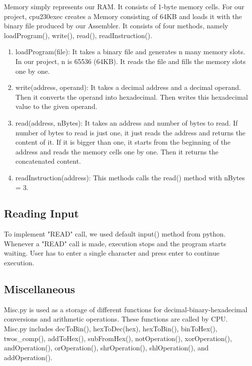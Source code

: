\documentclass[12pt,a4paper]{article}
\begin{document}
Memory simply represents our RAM. It consists of 1-byte memory cells. For our project, cpu230exec creates a Memory consisting of 64KB and loads it with the binary file produced by our Assembler. It consists of four methods, namely loadProgram(), write(), read(), readInstruction().

\begin{enumerate}
    \item loadProgram(file): It takes a binary file and generates n many memory slots. In our project, n is 65536 (64KB). It reads the file and fills the memory slots one by one.
    \item write(address, operand): It takes a decimal address and a decimal operand. Then it converts the operand into hexadecimal. Then writes this hexadecimal value to the given operand.
    \item read(address, nBytes): It takes an address and number of bytes to read. If number of bytes to read is just one, it just reads the address and returns the content of it. If it is bigger than one, it starts from the beginning of the address and reads the memory cells one by one. Then it returns the concatenated content.
    \item readInstruction(address): This methods calls the read() method with nBytes = 3.
\end{enumerate}

\subsection{Reading Input}

To implement "READ" call, we used default input() method from python. Whenever a "READ" call is made, execution stops and the program starts waiting. User has to enter a single character and press enter to continue execution.

\subsection{Miscellaneous}

Misc.py is used as a storage of different functions for decimal-binary-hexadecimal conversions and arithmetic operations. These functions are called by CPU. Misc.py includes decToBin(), hexToDec(hex), hexToBin(), binToHex(), twos\_comp(), addToHex(), subFromHex(), notOperation(), xorOperation(), andOperation(), orOperation(), shrOperation(), shlOperation(), and addOperation().
\end{document}
